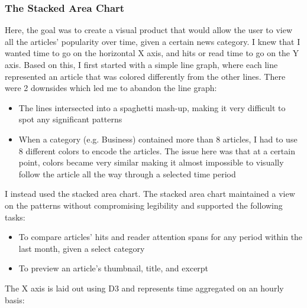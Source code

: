 \documentclass[12pt]{article}
\begin{document}
{\subsubsection{The Stacked Area Chart}

Here, the goal was to create a visual product that would allow the user to view all the articles' popularity over time, given a certain news category. I knew that I wanted time to go on the horizontal X axis, and hits or read time to go on the Y axis. Based on this, I first started with a simple line graph, where each line represented an article that was colored differently from the other lines. There were 2 downsides which led me to abandon the line graph: 
\begin{itemize}
\item The lines intersected into a spaghetti mash-up, making it very difficult to spot any significant patterns
\item When a category (e.g. Business) contained more than 8 articles, I had to use 8 different colors to encode the articles. The issue here was that at a certain point, colors became very similar making it almost impossible to visually follow the article all the way through a selected time period 
\end{itemize}

\noindent I instead used the stacked area chart. The stacked area chart maintained a view on the patterns without compromising legibility and supported the following tasks: 
\begin{itemize}
\item To compare articles' hits and reader attention spans for any period within the last month, given a select category
\item To preview an article's thumbnail, title, and excerpt
\end{itemize}

\noindent The X axis is laid out using D3 and represents time aggregated on an hourly basis: 

}
\end{document}
